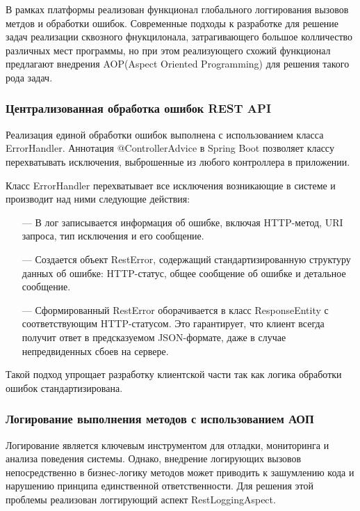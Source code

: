 В рамках платформы реализован функционал глобального логгирования вызовов метдов и обработки ошибок. 
Современные подходы к разработке для решение задач реализации сквозного фнукцилонала, затрагивающего большое колличество различных мест программы, но при этом реализующего схожий функционал предлагают внедрения AOP(Aspect Oriented Programming)\cite{kiczales1997aspect} для решения такого рода задач. 

\subsubsection{Централизованная обработка ошибок REST API}

Реализация единой обработки ошибок выполнена с использованием класса ErrorHandler. Аннотация @ControllerAdvice в Spring Boot позволяет классу перехватывать исключения, выброшенные из любого контроллера в приложении.

Класс ErrorHandler перехватывает все исключения возникающие в системе и производит над ними следующие действия:

\begin{itemize}
  \item[---]В лог записывается информация об ошибке, включая HTTP-метод, URI запроса, тип исключения и его сообщение.
  \item[---]Создается объект RestError, содержащий стандартизированную структуру данных об ошибке: HTTP-статус, общее сообщение об ошибке и детальное сообщение.
  \item[---]Сформированный RestError оборачивается в класс ResponseEntity с соответствующим HTTP-статусом. Это гарантирует, что клиент всегда получит ответ в предсказуемом JSON-формате, даже в случае непредвиденных сбоев на сервере.
\end{itemize}

Такой подход упрощает разработку клиентской части так как логика обработки ошибок стандартизирована.

\subsubsection{Логирование выполнения методов с использованием АОП}

Логирование является ключевым инструментом для отладки, мониторинга и анализа поведения системы.
Однако, внедрение логирующих вызовов непосредственно в бизнес-логику методов может приводить к зашумлению кода и нарушению принципа единственной ответственности.
Для решения этой проблемы реализован логгирующий аспект RestLoggingAspect.

